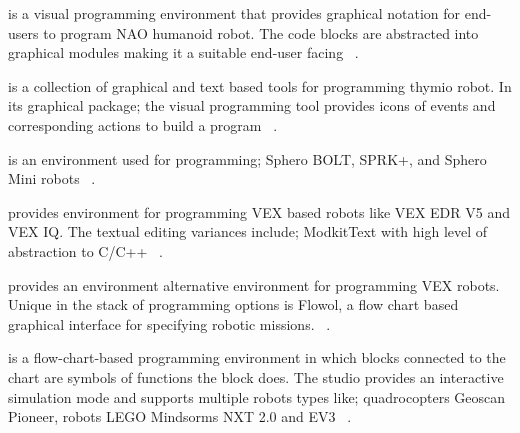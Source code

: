 \parhead{\tivipe} is a visual programming environment that provides graphical notation for end-users to program NAO humanoid robot. The code blocks are abstracted into graphical modules making it a suitable end-user facing ~\cite{TiViPE}.  %

\parhead{\aseba} is a collection of graphical and text based tools for programming thymio robot. In its graphical package; the visual programming tool provides icons of events and corresponding actions to build a program ~\cite{ASEBA,Magnenat2011}. %

\parhead{\sphero} is an environment used for programming; Sphero BOLT, SPRK+, and Sphero Mini robots ~\cite{Sphero}. %

\parhead{\vex} provides environment for programming VEX based robots like VEX EDR V5 and VEX IQ. 
The textual editing variances include; ModkitText with high level of abstraction to C/C++
~\cite{VexCodingStudio}. %

\parhead{\robotmesh} provides an environment alternative environment for programming VEX robots. Unique in the stack of programming options is Flowol, a flow chart based graphical interface for specifying robotic missions. %
~\cite{RobotMeshStudio}.

\parhead{\trik} is a flow-chart-based programming environment in which blocks connected to the chart are symbols of functions the block does. The studio provides an interactive simulation mode and supports multiple robots types like; quadrocopters Geoscan Pioneer, robots LEGO Mindsorms NXT 2.0 and EV3 ~\cite{STRIKStudio, Mordvinov2017}. 

